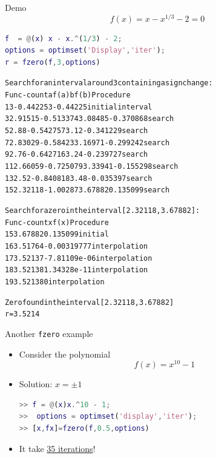 \documentclass[10pt]{beamer}
\begin{document}
\begin{frame}[fragile]{Demo}
$$
   f(x) = x - x^{1/3} - 2 = 0
$$
\begin{lstlisting}[language=matlab]
f  = @(x) x - x.^(1/3) - 2;
options = optimset('Display','iter');
r = fzero(f,3,options)
\end{lstlisting}

\begin{alltt}\tiny
 
Search for an interval around 3 containing a sign change:
 Func-count    a          f(a)             b          f(b)        Procedure
    1               3      -0.44225             3      -0.44225   initial interval
    3         2.91515     -0.513374       3.08485     -0.370868   search
    5            2.88     -0.542757          3.12     -0.341229   search
    7         2.83029      -0.58423       3.16971     -0.299242   search
    9            2.76     -0.642716          3.24     -0.239727   search
   11         2.66059     -0.725079       3.33941     -0.155298   search
   13            2.52     -0.840818          3.48     -0.035397   search
   15         2.32118      -1.00287       3.67882      0.135099   search
 
Search for a zero in the interval [2.32118, 3.67882]:
 Func-count    x          f(x)             Procedure
   15         3.67882      0.135099        initial
   16         3.51764   -0.00319777        interpolation
   17         3.52137  -7.81109e-06        interpolation
   18         3.52138   1.34328e-11        interpolation
   19         3.52138             0        interpolation
 
Zero found in the interval [2.32118, 3.67882]
r = 3.5214
\end{alltt}
    
\end{frame}

\begin{frame}[fragile]{Another \texttt{fzero} example}


\begin{itemize}
    \item Consider the polynomial
        \begin{equation*}
          f(x) = x^{10} - 1
        \end{equation*}
    \item Solution: $x=\pm 1$\\[3mm]
\begin{lstlisting}[language=matlab]
>> f = @(x)x.^10 - 1;
>>  options = optimset('display','iter');
>> [x,fx]=fzero(f,0.5,options)
\end{lstlisting}
    \item It take \underline{35 iterations}! 
\end{itemize}
\end{frame}
\end{document}
